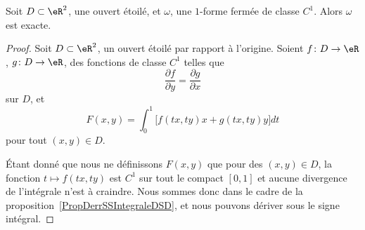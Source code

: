 \begin{theorem} \label{ThoMSofFxL}
	Soit $D\subset\eR^2$, une ouvert étoilé, et $\omega$, une $1$-forme fermée de classe $C^1$. Alors $\omega$ est exacte.
\end{theorem}
\begin{proof}

	Soit $D\subset\eR^2$, un ouvert étoilé par rapport à l'origine. Soient $f\colon D\to \eR$, $g\colon D\to \eR$, des fonctions de classe $C^1$ telles que
	\begin{equation}
		\frac{ \partial f }{ \partial y }=\frac{ \partial g }{ \partial x }
	\end{equation}
	sur $D$, et
	\begin{equation}		\label{EqIMDefFformI33}
		F(x,y)=\int_0^1\big[  f(tx,ty)x+g(tx,ty)y  \big]dt
	\end{equation}
	pour tout $(x,y)\in D$.

	Étant donné que nous ne définissons $F(x,y)$ que pour des $(x,y)\in D$, la fonction $t\mapsto f(tx,ty)$ est $C^1$ sur tout le compact $[0,1]$ et aucune divergence de l'intégrale n'est à craindre. Nous sommes donc dans le cadre de la proposition~\ref{PropDerrSSIntegraleDSD}, et nous pouvons dériver sous le signe intégral.


\end{proof}
